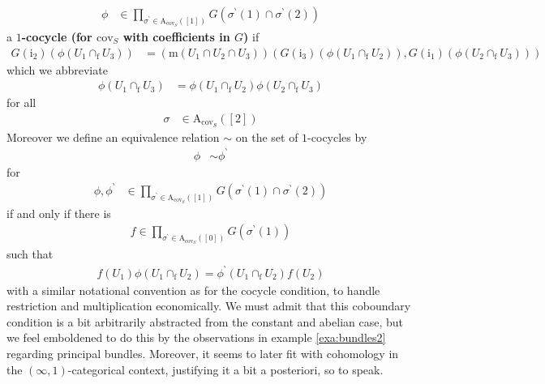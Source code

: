\begin{exa}
\begin{align*}
  \phi
  &\in
  \prod_{\sigma^{\backprime} \in \mathrm{A}_{\mathrm{cov}_{S}}([1])}
  G(\sigma^{\backprime}(1) \cap \sigma^{\backprime}(2))
\end{align*}
a \textbf{$1$-cocycle (for $\mathrm{cov}_{S}$ with coefficients in $G$)} if
\begin{align*}
  G(\mathrm{i}_{2})
  \left(
    \phi(U_{1} \cap_{\textrm{f}} U_{3})
  \right)
  &=
  \left(
    \mathrm{m}
    \left(
      U_{1}
      \cap
      U_{2}
      \cap
      U_{3}
    \right)
  \right)
  \left(
    G(\mathrm{i}_{3})
    \left(
      \phi(U_{1} \cap_{\textrm{f}} U_{2})
    \right),
    G(\mathrm{i}_{1})
    \left(
      \phi(U_{2} \cap_{\textrm{f}} U_{3})
    \right)
  \right)
\end{align*}
which we abbreviate
\begin{align*}
  \phi(U_{1} \cap_{\textrm{f}} U_{3})
  &=
  \phi(U_{1} \cap_{\textrm{f}} U_{2})
  \phi(U_{2} \cap_{\textrm{f}} U_{3})
\end{align*}
for all
\begin{align*}
  \sigma
  &\in
  \mathrm{A}_{\mathrm{cov}_{S}}([2])
\end{align*}
Moreover we define an equivalence relation $\sim$ on the set of $1$-cocycles by
\begin{align*}
  \phi
  &\sim
  \phi^{\backprime}
\end{align*}
for
\begin{align*}
  \phi,
  \phi^{\backprime}
  &\in
  \prod_{\sigma^{\backprime} \in \mathrm{A}_{\mathrm{cov}_{S}}([1])}
  G(\sigma^{\backprime}(1) \cap \sigma^{\backprime}(2))
\end{align*}
if and only if there is
\begin{align*}
  f
  \in
  \prod_{\sigma^{\backprime} \in \mathrm{A}_{\mathrm{cov}_{S}}([0])}
  G(\sigma^{\backprime}(1))
\end{align*}
such that
\begin{align*}
  f(U_{1})
  \phi(U_{1} \cap_{\textrm{f}} U_{2})
  =
  \phi^{\backprime}(U_{1} \cap_{\textrm{f}} U_{2})
  f(U_{2})
\end{align*}
with a similar notational convention as for the cocycle condition, to handle restriction and multiplication economically.
We must admit that this coboundary condition is a bit arbitrarily abstracted from the constant and abelian case, but we feel emboldened to do this by the observations in example \ref{exa:bundles2} regarding principal bundles.
Moreover, it seems to later fit with cohomology in the $(\infty,1)$-categorical context, justifying it a bit a posteriori, so to speak.

\end{exa}

